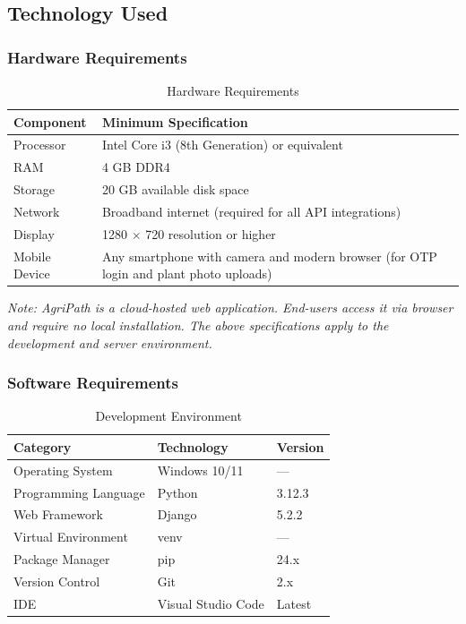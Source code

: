 \documentclass[12pt,a4paper]{article}
\begin{document}
\subsection{Technology Used}

\subsubsection{Hardware Requirements}

\begin{table}[h]
\caption{Hardware Requirements}
\centering
\begin{tabular}{|l|p{8cm}|}
\hline
\textbf{Component} & \textbf{Minimum Specification} \\ \hline
Processor & Intel Core i3 (8th Generation) or equivalent \\ \hline
RAM & 4 GB DDR4 \\ \hline
Storage & 20 GB available disk space \\ \hline
Network & Broadband internet (required for all API integrations) \\ \hline
Display & 1280 $\times$ 720 resolution or higher \\ \hline
Mobile Device & Any smartphone with camera and modern browser (for OTP login and plant photo uploads) \\ \hline
\end{tabular}
\end{table}

\noindent \textit{Note: AgriPath is a cloud-hosted web application. End-users access it via browser and require no local installation. The above specifications apply to the development and server environment.}

\subsubsection{Software Requirements}

\begin{table}[h]
\caption{Development Environment}
\centering
\begin{tabular}{|l|l|l|}
\hline
\textbf{Category} & \textbf{Technology} & \textbf{Version} \\ \hline
Operating System & Windows 10/11 & --- \\ \hline
Programming Language & Python & 3.12.3 \\ \hline
Web Framework & Django & 5.2.2 \\ \hline
Virtual Environment & venv & --- \\ \hline
Package Manager & pip & 24.x \\ \hline
Version Control & Git & 2.x \\ \hline
IDE & Visual Studio Code & Latest \\ \hline
\end{tabular}
\end{table}
\end{document}
